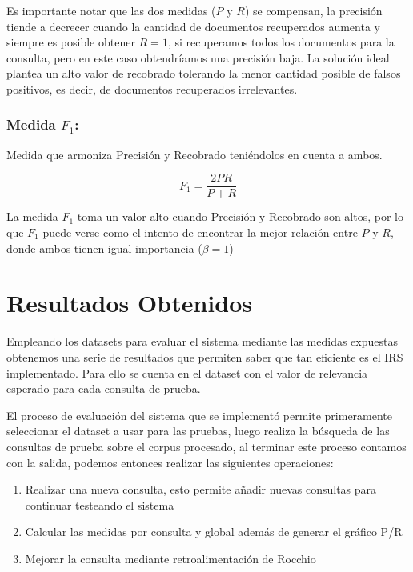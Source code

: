 \documentclass[runningheads,a4paper]{llncs}
\begin{document}
Es importante notar que las dos medidas ($P$ y $R$) se compensan, la precisión tiende a decrecer cuando la cantidad
de documentos recuperados aumenta y siempre es posible obtener $R = 1$, si recuperamos todos los documentos para la consulta, pero en este caso obtendríamos una precisión baja. La solución ideal plantea un alto valor de recobrado tolerando la menor cantidad posible de falsos positivos, es decir, de documentos recuperados irrelevantes.

\subsubsection*{Medida $F_1$:} Medida que armoniza Precisión y Recobrado teniéndolos en cuenta a ambos.

\begin{equation}
	F_1 = \frac{2 PR}{P + R}
\end{equation}

La medida $F_1$ toma un valor alto cuando Precisión y Recobrado son altos, por lo que $F_1$ puede verse como el intento de encontrar la mejor relación entre $P$ y $R$, donde ambos tienen igual importancia ($\beta = 1$)

\section{Resultados Obtenidos}

Empleando los datasets para evaluar el sistema mediante las medidas expuestas obtenemos una serie de resultados que permiten saber que tan eficiente es el IRS implementado. Para ello se cuenta en el dataset con el valor de relevancia esperado para cada consulta de prueba. 

El proceso de evaluación del sistema que se implementó permite primeramente seleccionar el dataset a usar para las pruebas, luego realiza la búsqueda de las consultas de prueba sobre el corpus procesado, al terminar este proceso contamos con la salida, podemos entonces realizar las siguientes operaciones:

\begin{enumerate}
	\item Realizar una nueva consulta, esto permite añadir nuevas consultas para continuar testeando el sistema
	\item Calcular las medidas por consulta y global además de generar el gráfico P/R 
	\item Mejorar la consulta mediante retroalimentación de Rocchio
\end{enumerate}
\end{document}
